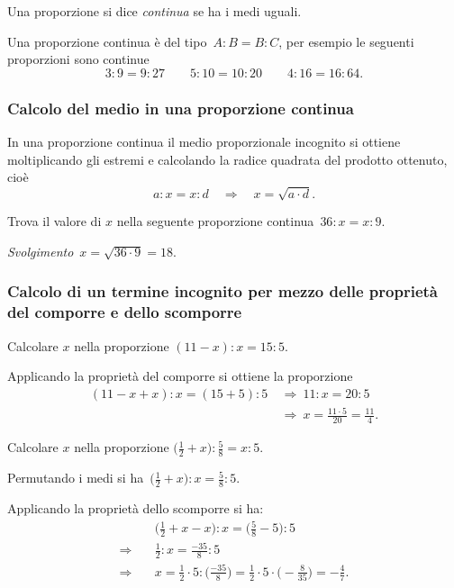 \begin{definizione}
  Una proporzione si dice \emph{continua} se ha i medi uguali.
\end{definizione}

Una proporzione continua è del tipo~$A:B=B:C$, per esempio le seguenti proporzioni sono continue
\[3:9=9:27\qquad5:10=10:20\qquad4:16=16:64.\]

\subsubsection*{Calcolo del medio in una proporzione continua}

In una proporzione continua il medio proporzionale incognito si ottiene moltiplicando gli estremi
e calcolando la radice quadrata del prodotto ottenuto, cioè
\[a:x=x:d\quad\Rightarrow\quad x=\sqrt{a\cdot d}.\]

\begin{exrig}
\begin{esempio}
Trova il valore di $x$ nella seguente proporzione continua~$36:x=x:9$.

\emph{Svolgimento}~$x=\sqrt{36\cdot 9}=18$.
\end{esempio}
\end{exrig}

\subsubsection*{Calcolo di un termine incognito per mezzo delle proprietà del comporre e dello scomporre}

\begin{exrig}
  \begin{esempio}
    Calcolare $x$ nella proporzione $(11-x):x=15:5$.

  Applicando la proprietà del comporre si ottiene la proporzione
  \begin{align*}
  (11-x+x):x=(15+5):5 &\:\Rightarrow\: 11:x=20:5\\
  &\:\Rightarrow\: x=\frac{11\cdot5}{20}=\frac{11}{4}.
  \end{align*}
  \end{esempio}

\begin{esempio}
 Calcolare $x$ nella proporzione $\displaystyle{\bigg(\frac{1}{2}+x\bigg):\frac{5}{8}=x:5}$.

 Permutando i medi si ha~$\displaystyle{\bigg(\frac{1}{2}+x\bigg):x=\frac{5}{8}:5}$.

 Applicando la proprietà dello scomporre si ha:
\begin{align*}
  &\bigg(\frac{1}{2}+x-x\bigg):x=\bigg(\frac{5}{8}-5\bigg):5\\
\Rightarrow\quad &\frac{1}{2}:x=\frac{-35}{8}:5\\
\Rightarrow\quad &x=\frac{1}{2}\cdot5:\bigg(\frac{-35}{8}\bigg)=\frac{1}{2}\cdot5%
\cdot\bigg(-\frac{8}{35}\bigg)=-\frac{4}{7}.
\end{align*}
\end{esempio}
\end{exrig}

